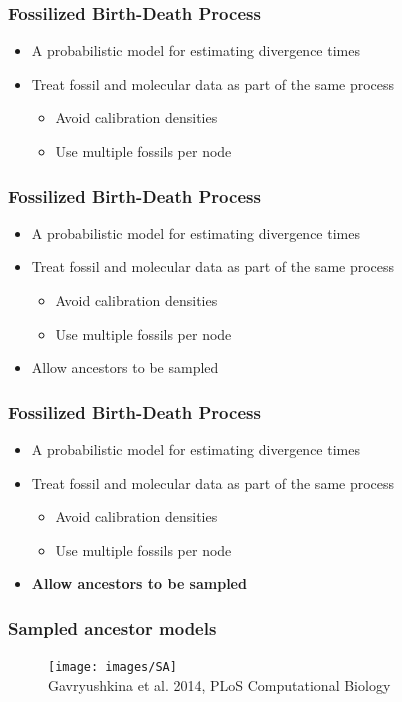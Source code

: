 \documentclass[]{beamer}
\begin{document}
\begin{frame}
\frametitle{Fossilized Birth-Death Process}
\begin{itemize}
\item A probabilistic model for estimating divergence times
\item Treat fossil and molecular data as part of the same process 
\begin{itemize}
	\item Avoid calibration densities 
	\item Use multiple fossils per node
\end{itemize}	
\end{itemize}
\end{frame}

\begin{frame}
\frametitle{Fossilized Birth-Death Process}
\begin{itemize}
\item A probabilistic model for estimating divergence times
\item Treat fossil and molecular data as part of the same process 
\begin{itemize}
	\item Avoid calibration densities 
	\item Use multiple fossils per node
\end{itemize}
\item Allow ancestors to be sampled 	
\end{itemize}
\end{frame}

\begin{frame}
\frametitle{Fossilized Birth-Death Process}
\begin{itemize}
\item A probabilistic model for estimating divergence times
\item Treat fossil and molecular data as part of the same process 
\begin{itemize}
	\item Avoid calibration densities 
	\item Use multiple fossils per node
\end{itemize}
\item \textbf{Allow ancestors to be sampled}	
\end{itemize}
\end{frame}

\begin{frame}
\frametitle{Sampled ancestor models}
\begin{figure}
\texttt{[image: images/SA]} \\
Gavryushkina et al. 2014, PLoS Computational Biology
\end{figure}
\end{frame}
\end{document}
